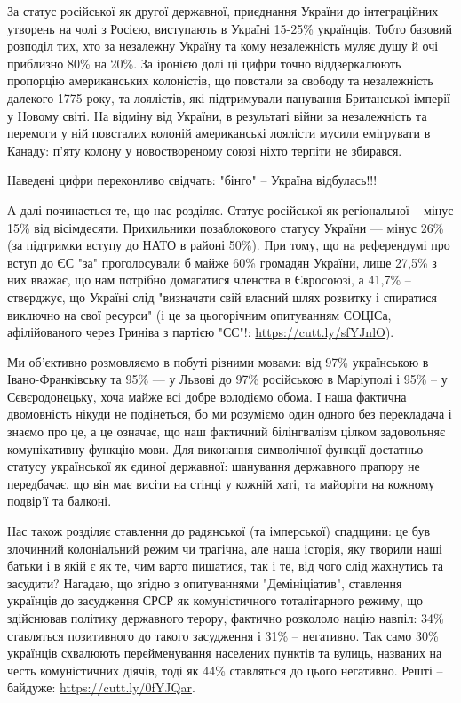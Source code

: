 \begin{itemize}
\begin{multicols}{2}
За статус російської як другої державної, приєднання України до інтеграційних
утворень на чолі з Росією, виступають в Україні 15-25\% українців. Тобто базовий
розподіл тих, хто за незалежну Україну та кому незалежність муляє душу й очі
приблизно 80\% на 20\%. За іронією долі ці цифри точно віддзеркалюють пропорцію
американських колоністів, що повстали за свободу та незалежність далекого 1775
року, та лоялістів, які підтримували панування Британської імперії у Новому
світі. На відміну від України, в результаті війни за незалежність та перемоги у
ній повсталих колоній американські лоялісти мусили емігрувати в Канаду: п’яту
колону у новоствореному союзі ніхто терпіти не збирався.

Наведені цифри переконливо свідчать: "бінго" – Україна відбулась!!!

А далі починається те, що нас розділяє. Статус російської як регіональної –
мінус 15\% від вісімдесяти. Прихильники позаблокового статусу України — мінус
26\% (за підтримки вступу до НАТО в районі 50\%). При тому, що на референдумі про
вступ до ЄС "за" проголосували б майже 60\% громадян України, лише 27,5\% з них
вважає, що нам потрібно домагатися членства в Євросоюзі, а 41,7\% – стверджує,
що Україні слід "визначати свій власний шлях розвитку і спиратися виключно на
свої ресурси" (і це за цьогорічним опитуванням СОЦІСа, афілійованого через
Гриніва з партією "ЄС"!: \url{https://cutt.ly/sfYJnlO}).

Ми об’єктивно розмовляємо в побуті різними мовами: від 97\% українською в
Івано-Франківську та 95\% — у Львові до 97\% російською в Маріуполі і 95\% – у
Сєвєродонецьку, хоча майже всі добре володіємо обома. І наша фактична
двомовність нікуди не подінеться, бо ми розуміємо один одного без перекладача і
знаємо про це, а це означає, що наш фактичний білінгвалізм цілком задовольняє
комунікативну функцію мови. Для виконання символічної функції достатньо статусу
української як єдиної державної: шанування державного прапору не передбачає, що
він має висіти на стінці у кожній хаті, та майоріти на кожному подвір’ї та
балконі.

Нас також розділяє ставлення до радянської (та імперської) спадщини: це був
злочинний колоніальний режим чи трагічна, але наша історія, яку творили наші
батьки і в якій є як те, чим варто пишатися, так і те, від чого слід жахнутись
та засудити? Нагадаю, що згідно з опитуваннями "Демініціатив", ставлення
українців до засудження СРСР як комуністичного тоталітарного режиму, що
здійснював політику державного терору, фактично розкололо націю навпіл: 34\%
ставляться позитивного до такого засудження і 31\% – негативно. Так само 30\%
українців схвалюють перейменування населених пунктів та вулиць, названих на
честь комуністичних діячів, тоді як 44\% ставляться до цього негативно. Решті –
байдуже: \url{https://cutt.ly/0fYJQar}.


\end{multicols}
\end{itemize}
